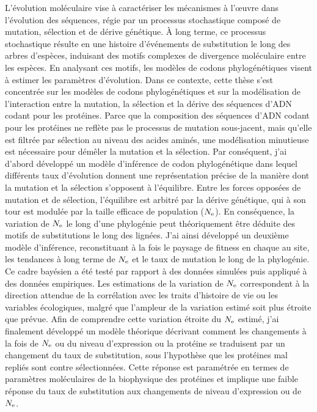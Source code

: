 L'évolution moléculaire vise à caractériser les mécanismes à l'œuvre dans l'évolution des séquences, régie par un processus stochastique composé de mutation, sélection et de dérive génétique.
À long terme, ce processus stochastique résulte en une histoire d'événements de substitution le long des arbres d'espèces, induisant des motifs complexes de divergence moléculaire entre les espèces.
En analysant ces motifs, les modèles de codons phylogénétiques visent à estimer les paramètres d'évolution.
Dans ce contexte, cette thèse s'est concentrée sur les modèles de codons phylogénétiques et sur la modélisation de l'interaction entre la mutation, la sélection et la dérive des séquences d'ADN codant pour les protéines.
Parce que la composition des séquences d'ADN codant pour les protéines ne reflète pas le processus de mutation sous-jacent, mais qu'elle est filtrée par sélection au niveau des acides aminés, une modélisation minutieuse est nécessaire pour démêler la mutation et la sélection.
Par conséquent, j'ai d'abord développé un modèle d'inférence de codon phylogénétique dans lequel différents taux d'évolution donnent une représentation précise de la manière dont la mutation et la sélection s'opposent à l'équilibre.
Entre les forces opposées de mutation et de sélection, l'équilibre est arbitré par la dérive génétique, qui à son tour est modulée par la taille efficace de population ($N_{\textrm{e}}$).
En conséquence, la variation de $N_{\textrm{e}}$ le long d'une phylogénie peut théoriquement être déduite des motifs de substitutions le long des lignées.
J'ai ainsi développé un deuxième modèle d'inférence, reconstituant à la fois le paysage de fitness en chaque au site, les tendances à long terme de $N_{\textrm{e}}$ et le taux de mutation le long de la phylogénie.
Ce cadre bayésien a été testé par rapport à des données simulées puis appliqué à des données empiriques.
Les estimations de la variation de $N_{\textrm{e}}$ correspondent à la direction attendue de la corrélation avec les traits d’histoire de vie ou les variables écologiques, malgré que l'ampleur de la variation estimé soit plus étroite que prévue.
Afin de comprendre cette variation étroite du $N_{\textrm{e}}$ estimé, j'ai finalement développé un modèle théorique décrivant comment les changements à la fois de $N_{\textrm{e}}$ ou du niveau d'expression ou la protéine se traduisent par un changement du taux de substitution, sous l'hypothèse que les protéines mal repliés sont contre sélectionnées.
Cette réponse est paramétrée en termes de paramètres moléculaires de la biophysique des protéines et implique une faible réponse du taux de substitution aux changements de niveau d'expression ou de $N_{\textrm{e}}$.


